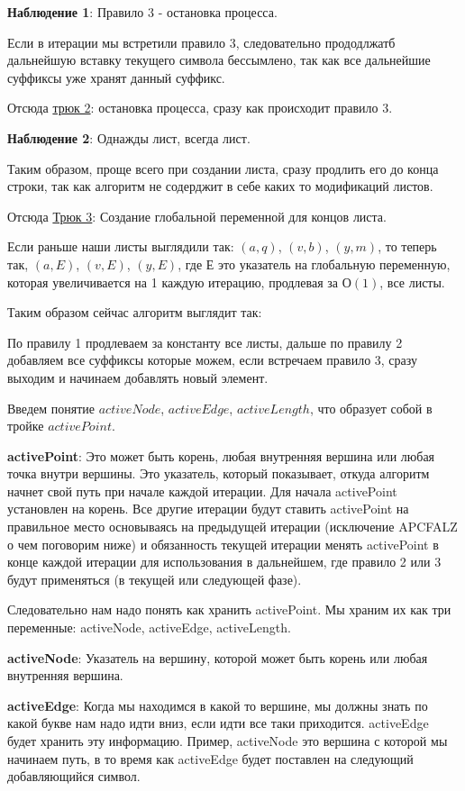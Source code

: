 \textbf{Наблюдение 1}: Правило 3 - остановка процесса.

Если в итерации мы встретили правило 3, следовательно прододлжатб дальнейшую вставку текущего символа бессымлено, так как все дальнейшие суффиксы уже хранят данный суффикс.

Отсюда \underline{трюк 2}: остановка процесса, сразу как происходит правило 3.

\textbf{Наблюдение 2}: Однажды лист, всегда лист.

Таким образом, проще всего при создании листа, сразу продлить его до конца строки, так как алгоритм не содерджит в себе каких то модификаций листов.

Отсюда \underline{Трюк 3}: Создание глобальной переменной для концов листа.

Если раньше наши листы выглядили так: $(a,q)$, $(v,b)$, $(y,m)$, то теперь так, $(a,E)$, $(v,E)$, $(y,E)$, где $Е$ это указатель на глобальную переменную, которая увеличивается на 1 каждую итерацию, продлевая за $О(1)$, все листы.

Таким образом сейчас алгоритм выглядит так:

По правилу 1 продлеваем за константу все листы, дальше по правилу 2 добавляем все суффиксы которые можем, если встречаем правило 3, сразу выходим и начинаем добавлять новый элемент.

Введем понятие $activeNode$, $activeEdge$, $activeLength$, что образует собой в тройке $activePoint$.

\textbf{activePoint}: Это может быть корень, любая внутренняя вершина или любая точка внутри вершины. Это указатель, который показывает, откуда алгоритм начнет свой путь при начале каждой итерации. Для начала activePoint установлен на корень. Все другие итерации будут ставить activePoint на правильное место основываясь на предыдущей итерации (исключение APCFALZ о чем поговорим ниже) и обязанность текущей итерации менять activePoint в конце каждой итерации для использования в дальнейшем, где правило 2 или 3 будут применяться (в текущей или следующей фазе).

Следовательно нам надо понять как хранить activePoint. Мы храним их как три переменные: activeNode, activeEdge, activeLength.

\textbf{activeNode}: Указатель на вершину, которой может быть корень или любая внутренняя вершина.

\textbf{activeEdge}: Когда мы находимся в какой то вершине, мы должны знать по какой букве нам надо идти вниз, если идти все таки приходится. activeEdge будет хранить эту информацию. Пример, activeNode это вершина с которой мы начинаем путь, в то время как activeEdge будет поставлен на следующий добавляющийся символ.

